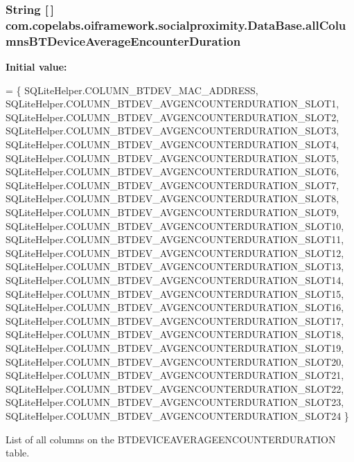 \subsubsection[{all\+Columns\+B\+T\+Device\+Average\+Encounter\+Duration}]{\setlength{\rightskip}{0pt plus 5cm}String \mbox{[}$\,$\mbox{]} com.\+copelabs.\+oiframework.\+socialproximity.\+Data\+Base.\+all\+Columns\+B\+T\+Device\+Average\+Encounter\+Duration\hspace{0.3cm}{\ttfamily [private]}}\label{classcom_1_1copelabs_1_1oiframework_1_1socialproximity_1_1_data_base_a9d9e2c5f94f3e5421fcc03df0f4a1aea}
{\bfseries Initial value\+:}
\begin{DoxyCode}
= \{ 
        SQLiteHelper.COLUMN\_BTDEV\_MAC\_ADDRESS,
        SQLiteHelper.COLUMN\_BTDEV\_AVGENCOUNTERDURATION\_SLOT1,
        SQLiteHelper.COLUMN\_BTDEV\_AVGENCOUNTERDURATION\_SLOT2,
        SQLiteHelper.COLUMN\_BTDEV\_AVGENCOUNTERDURATION\_SLOT3,
        SQLiteHelper.COLUMN\_BTDEV\_AVGENCOUNTERDURATION\_SLOT4,
        SQLiteHelper.COLUMN\_BTDEV\_AVGENCOUNTERDURATION\_SLOT5,
        SQLiteHelper.COLUMN\_BTDEV\_AVGENCOUNTERDURATION\_SLOT6,
        SQLiteHelper.COLUMN\_BTDEV\_AVGENCOUNTERDURATION\_SLOT7,
        SQLiteHelper.COLUMN\_BTDEV\_AVGENCOUNTERDURATION\_SLOT8,
        SQLiteHelper.COLUMN\_BTDEV\_AVGENCOUNTERDURATION\_SLOT9,
        SQLiteHelper.COLUMN\_BTDEV\_AVGENCOUNTERDURATION\_SLOT10,
        SQLiteHelper.COLUMN\_BTDEV\_AVGENCOUNTERDURATION\_SLOT11,
        SQLiteHelper.COLUMN\_BTDEV\_AVGENCOUNTERDURATION\_SLOT12,
        SQLiteHelper.COLUMN\_BTDEV\_AVGENCOUNTERDURATION\_SLOT13,
        SQLiteHelper.COLUMN\_BTDEV\_AVGENCOUNTERDURATION\_SLOT14,
        SQLiteHelper.COLUMN\_BTDEV\_AVGENCOUNTERDURATION\_SLOT15,
        SQLiteHelper.COLUMN\_BTDEV\_AVGENCOUNTERDURATION\_SLOT16,
        SQLiteHelper.COLUMN\_BTDEV\_AVGENCOUNTERDURATION\_SLOT17,
        SQLiteHelper.COLUMN\_BTDEV\_AVGENCOUNTERDURATION\_SLOT18,
        SQLiteHelper.COLUMN\_BTDEV\_AVGENCOUNTERDURATION\_SLOT19,
        SQLiteHelper.COLUMN\_BTDEV\_AVGENCOUNTERDURATION\_SLOT20,
        SQLiteHelper.COLUMN\_BTDEV\_AVGENCOUNTERDURATION\_SLOT21,
        SQLiteHelper.COLUMN\_BTDEV\_AVGENCOUNTERDURATION\_SLOT22,
        SQLiteHelper.COLUMN\_BTDEV\_AVGENCOUNTERDURATION\_SLOT23,
        SQLiteHelper.COLUMN\_BTDEV\_AVGENCOUNTERDURATION\_SLOT24
    \}
\end{DoxyCode}
List of all columns on the B\+T\+D\+E\+V\+I\+C\+E\+A\+V\+E\+R\+A\+G\+E\+E\+N\+C\+O\+U\+N\+T\+E\+R\+D\+U\+R\+A\+T\+I\+O\+N table. \hypertarget{classcom_1_1copelabs_1_1oiframework_1_1socialproximity_1_1_data_base_a2d4588f35ae5dbb0fd852124e2960c46}{}
